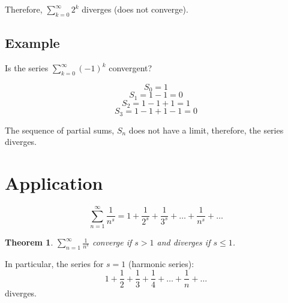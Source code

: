 \documentclass[12pt]{scrbook}
\newtheorem{theorem}{Theorem}[section]
\begin{document}
Therefore, $\sum_{k=0}^{\infty} {2^k} $ diverges (does not converge).

\subsection{Example}
Is the series $\sum_{k=0}^{\infty} (-1)^k $ convergent?

\[S_0 = 1 \]
\[S_1 = 1 - 1 = 0 \]
\[S_2 = 1 - 1 + 1 = 1 \]
\[S_3 = 1 - 1 + 1 -1 = 0 \]

The sequence of partial sums, $S_n$ does not have a limit, therefore,
the series diverges.

\section{Application}

\[ \sum_{n=1}^{\infty} \frac{1}{n^s} = 1 + \frac{1}{2^s} +\frac{1}{3^s} + \ldots + \frac{1}{n^s} + \ldots \]

\begin{theorem}
$ \sum_{n=1}^{\infty} \frac{1}{n^s} $ converge if $s > 1$ and diverges
if $ s \leq 1 $.
\end{theorem}

In particular, the series for $s = 1$ (harmonic series):
\[ 1 + \frac{1}{2} + \frac{1}{3} + \frac{1}{4} + \ldots + \frac{1}{n} + \ldots \]
diverges.
\end{document}
